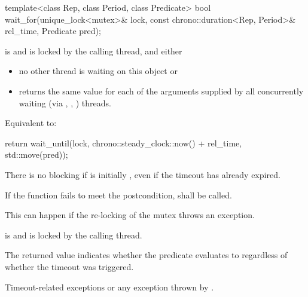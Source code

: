 %
\begin{itemdecl}
template<class Rep, class Period, class Predicate>
  bool wait_for(unique_lock<mutex>& lock,
                const chrono::duration<Rep, Period>& rel_time,
                Predicate pred);
\end{itemdecl}
\begin{itemdescr}
 \pnum \requires {} is  and 
        is locked by the calling thread, and either
        \begin{itemize}
        \item no other thread is waiting on this  object or
        \item {} returns the same value for each of the  arguments
                supplied by all concurrently waiting (via ,
                , ) threads.
        \end{itemize}
 
 \pnum \effects Equivalent to:
\begin{codeblock}
return wait_until(lock, chrono::steady_clock::now() + rel_time, std::move(pred));
\end{codeblock}
 
 \pnum \begin{note} There is no blocking if  is initially , even if the
        timeout has already expired. \end{note}
 
 \pnum \remarks
        If the function fails to meet the postcondition, 
        shall be called.
        \begin{note} This can happen if the re-locking of the mutex throws an exception. \end{note}
 
 \pnum \postconditions {} is  and 
        is locked by the calling thread.
 
 \pnum \begin{note} The returned value indicates whether the predicate evaluates to 
        regardless of whether the timeout was triggered. \end{note}
 
 \pnum \throws Timeout-related exceptions or any exception thrown by .
\end{itemdescr}




